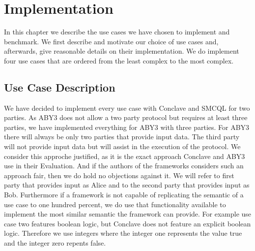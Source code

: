 \chapter{Implementation}
\label{Implementation}	
In this chapter we describe the use cases we have chosen to implement and benchmark. We first describe and motivate our choice of use cases and, afterwards, give reasonable details on their implementation. We do implement four use cases that are ordered from the least complex to the most complex.
\section{Use Case Description} 
We have decided to implement every use case with Conclave and SMCQL for two parties. As ABY3 does not allow a two party protocol but requires at least three parties, we have implemented everything for ABY3 with three parties. For ABY3 there will always be only two parties that provide input data. The third party will not provide input data but will assist in the execution of the protocol. We consider this approche justified, as it is the exact approach Conclave and ABY3 use in their Evaluation. And if the authors of the frameworks considers such an approach fair, then we do hold no objections against it.  
We will refer to first party that provides input as Alice and to the second party that provides input as Bob. Furthermore if a framework is not capable of replicating the semantic of a use case to one hundred percent, we do use that functionality available to implement the most similar semantic the framework can provide. For example use case two features boolean logic, but Conclave does not feature an explicit boolean logic. Therefore we use integers where the integer one represents the value true and the integer zero repents false.   
